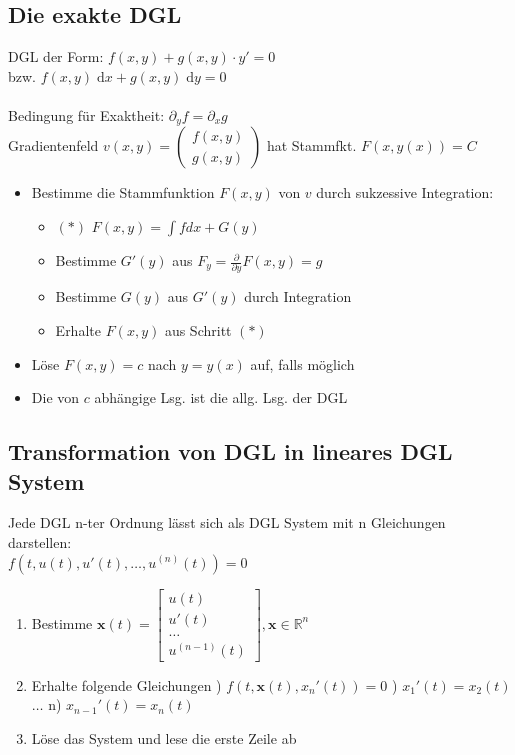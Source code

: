 \documentclass[6pt,a4paper]{scrartcl}
\newcommand{\mat}[1]{\ensuremath{\begin{bmatrix} #1 \end{bmatrix}}}								%
\newcommand{\vect}[1]{\ensuremath{\begin{pmatrix} #1 \end{pmatrix}}}							%
\renewcommand{\vec}[1]{\ensuremath{\boldsymbol {#1}}}											%
\newcommand{\diff}{\ensuremath{\;\mathrm d}}									%
\newcommand{\R}{\ensuremath{\mathbb R}}
\begin{document}
\begin{multicols*}{4}
\subsection{Die exakte DGL}
DGL der Form: $\boxed{f(x,y) + g(x,y) \cdot y' = 0}$ \\   
bzw. $f(x,y) \diff x + g(x,y) \diff y = 0$\\ \\
Bedingung für Exaktheit: $\partial_y f = \partial_x g$\\
Gradientenfeld $v(x,y) = \vect{f(x,y) \\ g(x,y)}$ hat Stammfkt. $F(x,y(x)) = C$
\begin{itemize}\itemsep-4pt 
	\item Bestimme die Stammfunktion $F(x,y)$ von $v$ durch sukzessive Integration:
	\begin{itemize}
		\item $(*)$ $F(x,y) = \int f dx + G(y)$
		\item Bestimme $G'(y)$ aus $F_y = \frac{\partial}{\partial y} F(x,y) = g$
		\item Bestimme $G(y)$ aus $G'(y)$ durch Integration
		\item Erhalte $F(x,y)$ aus Schritt $(*)$
	\end{itemize}
	\item Löse $F(x,y) = c$ nach $y = y(x)$ auf, falls möglich
	\item Die von $c$ abhängige Lsg. ist die allg. Lsg. der DGL
\end{itemize}
\fi
\subsection{Transformation von DGL in lineares DGL System}
Jede DGL n-ter Ordnung lässt sich als DGL System mit n Gleichungen darstellen:\\
$\boxed{f(t, u(t), u'(t),\hdots , u^{(n)}(t)) = 0}$\\
\begin{enumerate}
	\item Bestimme $\vec x(t) = \mat{u(t) \\ u'(t) \\ \hdots \\ u^{(n-1)}(t)}, \vec x \in \R^n$ 
	\item Erhalte folgende Gleichungen
		) $f(t, \vec x(t), x_n'(t)) = 0$
		) $x_1'(t) = x_2(t)$
		\subitem $\hdots$
		\subitem n) $x_{n-1}'(t) = x_n(t)$
	\item Löse das System und lese die erste Zeile ab
\end{enumerate}


\end{multicols*}
\end{document}
